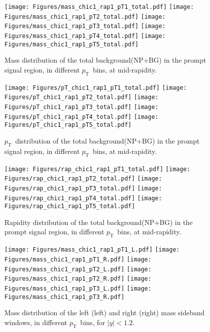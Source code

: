 \documentclass[12pt]{article}
\newcommand{\pt}{$p_{\mathrm{T}}$}
\begin{document}
\begin{figure}[htbp]
\centering
\texttt{[image: Figures/mass\_chic1\_rap1\_pT1\_total.pdf]}
\texttt{[image: Figures/mass\_chic1\_rap1\_pT2\_total.pdf]}
\texttt{[image: Figures/mass\_chic1\_rap1\_pT3\_total.pdf]}
\texttt{[image: Figures/mass\_chic1\_rap1\_pT4\_total.pdf]}
\texttt{[image: Figures/mass\_chic1\_rap1\_pT5\_total.pdf]}
\caption{Mass distribution of the total
  background(NP+BG) in the prompt signal region,
   in different \pt\ bins, at mid-rapidity.}
\end{figure}
\clearpage

\begin{figure}[htbp]
\centering
\texttt{[image: Figures/pT\_chic1\_rap1\_pT1\_total.pdf]}
\texttt{[image: Figures/pT\_chic1\_rap1\_pT2\_total.pdf]}
\texttt{[image: Figures/pT\_chic1\_rap1\_pT3\_total.pdf]}
\texttt{[image: Figures/pT\_chic1\_rap1\_pT4\_total.pdf]}
\texttt{[image: Figures/pT\_chic1\_rap1\_pT5\_total.pdf]}
\caption{\pt\ distribution of the total
  background(NP+BG) in the prompt signal region,
   in different \pt\ bins, at mid-rapidity.}
\end{figure}
\clearpage

\begin{figure}[htbp]
\centering
\texttt{[image: Figures/rap\_chic1\_rap1\_pT1\_total.pdf]}
\texttt{[image: Figures/rap\_chic1\_rap1\_pT2\_total.pdf]}
\texttt{[image: Figures/rap\_chic1\_rap1\_pT3\_total.pdf]}
\texttt{[image: Figures/rap\_chic1\_rap1\_pT4\_total.pdf]}
\texttt{[image: Figures/rap\_chic1\_rap1\_pT5\_total.pdf]}
\caption{Rapidity distribution of the total
  background(NP+BG) in the prompt signal region,
   in different \pt\ bins, at mid-rapidity.}
\end{figure}
\clearpage


\begin{figure}[htbp]
\centering
\texttt{[image: Figures/mass\_chic1\_rap1\_pT1\_L.pdf]}
\texttt{[image: Figures/mass\_chic1\_rap1\_pT1\_R.pdf]}
\texttt{[image: Figures/mass\_chic1\_rap1\_pT2\_L.pdf]}
\texttt{[image: Figures/mass\_chic1\_rap1\_pT2\_R.pdf]}
\texttt{[image: Figures/mass\_chic1\_rap1\_pT3\_L.pdf]}
\texttt{[image: Figures/mass\_chic1\_rap1\_pT3\_R.pdf]}
\caption{Mass distribution of the left (left) and
  right (right) mass sideband windows, in different
  \pt\ bins, for $|y| < 1.2$.}
\end{figure}
\clearpage
\end{document}
